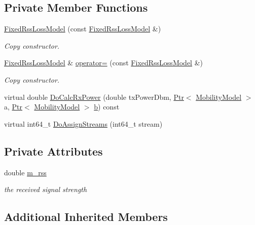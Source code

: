 \subsection*{Private Member Functions}
\begin{DoxyCompactItemize}
\item 
\hyperlink{classns3_1_1FixedRssLossModel_a1f3c089482beb962e905222e9fef4f06}{Fixed\+Rss\+Loss\+Model} (const \hyperlink{classns3_1_1FixedRssLossModel}{Fixed\+Rss\+Loss\+Model} \&)
\begin{DoxyCompactList}\small\item\em Copy constructor. \end{DoxyCompactList}\item 
\hyperlink{classns3_1_1FixedRssLossModel}{Fixed\+Rss\+Loss\+Model} \& \hyperlink{classns3_1_1FixedRssLossModel_a47306f84dd822dcd669d479364b6fbf9}{operator=} (const \hyperlink{classns3_1_1FixedRssLossModel}{Fixed\+Rss\+Loss\+Model} \&)
\begin{DoxyCompactList}\small\item\em Copy constructor. \end{DoxyCompactList}\item 
virtual double \hyperlink{classns3_1_1FixedRssLossModel_a1883cf66e3df0a501be6b82c027cf279}{Do\+Calc\+Rx\+Power} (double tx\+Power\+Dbm, \hyperlink{classns3_1_1Ptr}{Ptr}$<$ \hyperlink{classns3_1_1MobilityModel}{Mobility\+Model} $>$ a, \hyperlink{classns3_1_1Ptr}{Ptr}$<$ \hyperlink{classns3_1_1MobilityModel}{Mobility\+Model} $>$ \hyperlink{lte__pathloss_8m_a21ad0bd836b90d08f4cf640b4c298e7c}{b}) const 
\item 
virtual int64\+\_\+t \hyperlink{classns3_1_1FixedRssLossModel_ab73055490eadd2f10f1bfe7d90c2f9f3}{Do\+Assign\+Streams} (int64\+\_\+t stream)
\end{DoxyCompactItemize}
\subsection*{Private Attributes}
\begin{DoxyCompactItemize}
\item 
double \hyperlink{classns3_1_1FixedRssLossModel_a11f042689e5bc560a89be05ad550da82}{m\+\_\+rss}
\begin{DoxyCompactList}\small\item\em the received signal strength \end{DoxyCompactList}\end{DoxyCompactItemize}
\subsection*{Additional Inherited Members}



